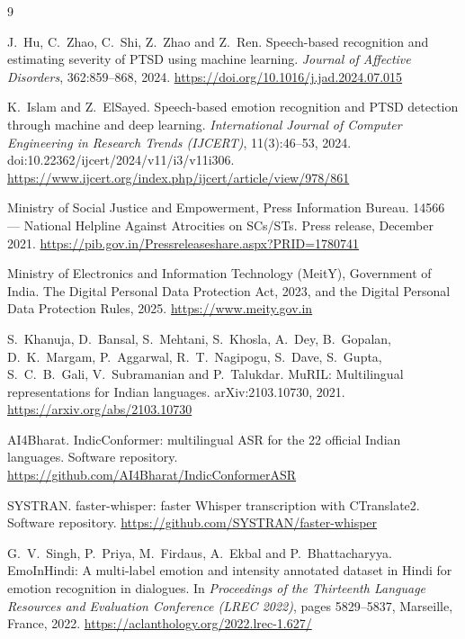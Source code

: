 \documentclass[11pt,a4paper]{article}
\begin{document}
\begin{thebibliography}{9}
\setlength{\itemsep}{3pt}
\small

J.~Hu, C.~Zhao, C.~Shi, Z.~Zhao and Z.~Ren.
Speech-based recognition and estimating severity of PTSD using machine learning.
\emph{Journal of Affective Disorders}, 362:859--868, 2024.
\url{https://doi.org/10.1016/j.jad.2024.07.015}

K.~Islam and Z.~ElSayed.
Speech-based emotion recognition and PTSD detection through machine and deep learning.
\emph{International Journal of Computer Engineering in Research Trends (IJCERT)}, 11(3):46--53, 2024.
doi:10.22362/ijcert/2024/v11/i3/v11i306.
\url{https://www.ijcert.org/index.php/ijcert/article/view/978/861}

Ministry of Social Justice and Empowerment, Press Information Bureau.
14566 --- National Helpline Against Atrocities on SCs/STs. Press release, December 2021.
\url{https://pib.gov.in/Pressreleaseshare.aspx?PRID=1780741}

Ministry of Electronics and Information Technology (MeitY), Government of India.
The Digital Personal Data Protection Act, 2023, and the Digital Personal Data Protection Rules, 2025.
\url{https://www.meity.gov.in}

S.~Khanuja, D.~Bansal, S.~Mehtani, S.~Khosla, A.~Dey, B.~Gopalan, D.~K.~Margam, P.~Aggarwal,
R.~T.~Nagipogu, S.~Dave, S.~Gupta, S.~C.~B.~Gali, V.~Subramanian and P.~Talukdar.
MuRIL: Multilingual representations for Indian languages.
arXiv:2103.10730, 2021.
\url{https://arxiv.org/abs/2103.10730}

AI4Bharat.
IndicConformer: multilingual ASR for the 22 official Indian languages. Software repository.
\url{https://github.com/AI4Bharat/IndicConformerASR}

SYSTRAN.
faster-whisper: faster Whisper transcription with CTranslate2. Software repository.
\url{https://github.com/SYSTRAN/faster-whisper}

G.~V.~Singh, P.~Priya, M.~Firdaus, A.~Ekbal and P.~Bhattacharyya.
EmoInHindi: A multi-label emotion and intensity annotated dataset in Hindi for emotion recognition
in dialogues. In \emph{Proceedings of the Thirteenth Language Resources and Evaluation Conference
(LREC 2022)}, pages 5829--5837, Marseille, France, 2022.
\url{https://aclanthology.org/2022.lrec-1.627/}

\end{thebibliography}

\end{document}
